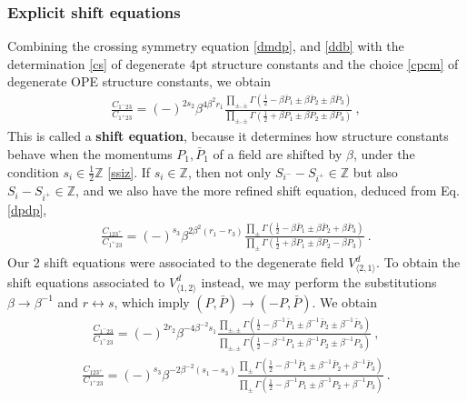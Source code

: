 \documentclass[12pt, a4paper]{article}
\newcommand{\myindex}[1]{\textbf{\boldmath #1}}
\begin{document}
\subsubsection{Explicit shift equations}

Combining the crossing symmetry equation \eqref{dmdp}, and \eqref{ddb} with the determination \eqref{cs} of degenerate 4pt structure constants and the choice \eqref{cpcm} of degenerate OPE structure constants, we obtain
\begin{align}
 \boxed{\frac{C_{1^-23}}{C_{1^+23}} = 
 (-)^{2s_2}\beta^{4\beta^2r_1} \frac{\prod_{\pm,\pm}\Gamma\left(\tfrac12 -\beta\bar P_1\pm\beta \bar P_2\pm\beta \bar P_3\right)}{\prod_{\pm,\pm}
 \Gamma\left(\tfrac12 +\beta P_1\pm \beta P_2\pm\beta P_3\right)}} \ ,
 \label{sh-mp}
\end{align}
This is called a \myindex{shift equation}, because it determines how structure constants behave when the momentums $P_1,\bar P_1$ of a field are shifted by $\beta$, under the condition $s_i\in \frac12 \mathbb{Z}$ \eqref{ssiz}. If $s_i\in\mathbb{Z}$, then not only $S_{i^-}-S_{i^+}\in\mathbb{Z}$ but also $S_{i}-S_{i^+}\in\mathbb{Z}$, and we also have the more refined shift equation, deduced from Eq. \eqref{dpdp},
\begin{align}
 \boxed{\frac{C_{123^+}}{C_{1^+23}} = 
 (-)^{s_3} \beta^{2\beta^2(r_1-r_3)}
 \frac{ \prod_\pm\Gamma\left(\frac12 -\beta\bar P_1 \pm \beta\bar P_2 +\beta\bar P_3\right)}{ \prod_\pm\Gamma\left(\frac12+\beta P_1 \pm \beta P_2 -\beta P_3\right)}}\ .
 \label{sh-pp}
\end{align}
Our 2 shift equations were associated to the degenerate field $V^d_{\langle 2,1\rangle}$. To obtain the shift equations associated to $V^d_{\langle 1,2\rangle}$ instead, we may perform the substitutions $\beta\to \beta^{-1}$ and $r\leftrightarrow s$, which imply $(P,\bar P)\to (-P,\bar P)$. We obtain 
\begin{align}
 \frac{C_{1^-23}}{C_{1^+23}} = 
 (-)^{2r_2}\beta^{-4\beta^{-2}s_1} \frac{\prod_{\pm,\pm}\Gamma\left(\tfrac12 -\beta^{-1}\bar P_1\pm\beta^{-1} \bar P_2\pm\beta^{-1} \bar P_3\right)}{\prod_{\pm,\pm}
 \Gamma\left(\tfrac12 -\beta^{-1} P_1\pm \beta^{-1} P_2\pm\beta^{-1} P_3\right)} \ ,
 \label{sh-mp2}
\end{align}
\begin{align}
\frac{C_{123^+}}{C_{1^+23}} = 
 (-)^{s_3} \beta^{-2\beta^{-2}(s_1-s_3)}
 \frac{ \prod_\pm\Gamma\left(\frac12 -\beta^{-1}\bar P_1 \pm \beta^{-1}\bar P_2 +\beta^{-1}\bar P_3\right)}{ \prod_\pm\Gamma\left(\frac12-\beta^{-1} P_1 \pm \beta^{-1} P_2 +\beta^{-1} P_3\right)}\ .
 \label{sh-pp2}
\end{align}
\end{document}
